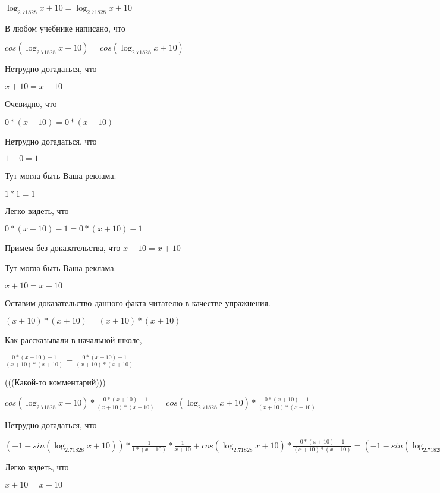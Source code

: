 \documentclass[12pt,a4paper,fleqn]{article}
\theoremstyle{definition}
\begin{document}
$\log_{ 2.71828 }{ x  +  10 } = \log_{ 2.71828 }{ x  +  10 }$

В любом учебнике написано, что

$cos(\log_{ 2.71828 }{ x  +  10 }) = cos(\log_{ 2.71828 }{ x  +  10 })$

Нетрудно догадаться, что

$ x  +  10  =  x  +  10 $

Очевидно, что

$ 0  * ( x  +  10 ) =  0  * ( x  +  10 )$

Нетрудно догадаться, что

$ 1  +  0  =  1 $

Тут могла быть Ваша реклама.

$ 1  *  1  =  1 $

Легко видеть, что

$ 0  * ( x  +  10 ) -  1  =  0  * ( x  +  10 ) -  1 $

Примем без доказательства, что
$ x  +  10  =  x  +  10 $

Тут могла быть Ваша реклама.

$ x  +  10  =  x  +  10 $

Оставим доказательство данного факта читателю в качестве упражнения.

$( x  +  10 ) * ( x  +  10 ) = ( x  +  10 ) * ( x  +  10 )$

Как рассказывали в начальной школе,

$\frac{ 0  * ( x  +  10 ) -  1 }{( x  +  10 ) * ( x  +  10 )}
 = \frac{ 0  * ( x  +  10 ) -  1 }{( x  +  10 ) * ( x  +  10 )}
$

(((Какой-то комментарий)))

$cos(\log_{ 2.71828 }{ x  +  10 }) * \frac{ 0  * ( x  +  10 ) -  1 }{( x  +  10 ) * ( x  +  10 )}
 = cos(\log_{ 2.71828 }{ x  +  10 }) * \frac{ 0  * ( x  +  10 ) -  1 }{( x  +  10 ) * ( x  +  10 )}
$

Нетрудно догадаться, что

$( -1  - sin(\log_{ 2.71828 }{ x  +  10 })) * \frac{ 1 }{ 1  * ( x  +  10 )}
 * \frac{ 1 }{ x  +  10 }
 + cos(\log_{ 2.71828 }{ x  +  10 }) * \frac{ 0  * ( x  +  10 ) -  1 }{( x  +  10 ) * ( x  +  10 )}
 = ( -1  - sin(\log_{ 2.71828 }{ x  +  10 })) * \frac{ 1 }{ 1  * ( x  +  10 )}
 * \frac{ 1 }{ x  +  10 }
 + cos(\log_{ 2.71828 }{ x  +  10 }) * \frac{ 0  * ( x  +  10 ) -  1 }{( x  +  10 ) * ( x  +  10 )}
$

Легко видеть, что

$ x  +  10  =  x  +  10 $
\end{document}
